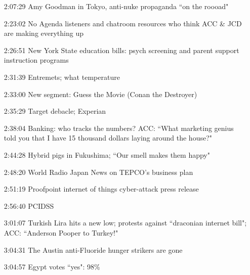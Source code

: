\documentclass{report}
\newcommand{\mono}[1]{{\fontspec{Courier}#1}}
\begin{document}
\begin{itemize}
\item[\mono{2:07:29}] Amy Goodman in Tokyo, anti-nuke propaganda ``on the roooad"
\item[\mono{2:23:02}] No Agenda listeners and chatroom resources who think ACC \& JCD are making everything up
\item[\mono{2:26:51}] New York State education bills: psych screening and parent support instruction programs
\item[\mono{2:31:39}] Entremets; what temperature
\item[\mono{2:33:00}] New segment: Guess the Movie (Conan the Destroyer)
\item[\mono{2:35:29}] Target debacle; Experian
\item[\mono{2:38:04}] Banking: who tracks the numbers? ACC: ``What marketing genius told you that I have 15 thousand dollars laying around the house?"
\item[\mono{2:44:28}] Hybrid pigs in Fukushima; ``Our smell makes them happy"
\item[\mono{2:48:20}] World Radio Japan News on TEPCO's business plan
\item[\mono{2:51:19}] Proofpoint internet of things cyber-attack press release
\item[\mono{2:56:40}] PCIDSS
\item[\mono{3:01:07}] Turkish Lira hits a new low; protests against ``draconian internet bill"; ACC: ``Anderson Pooper to Turkey!"
\item[\mono{3:04:31}] The Austin anti-Fluoride hunger strikers are gone
\item[\mono{3:04:57}] Egypt votes ``yes": 98\%
\end{itemize}
\end{document}
